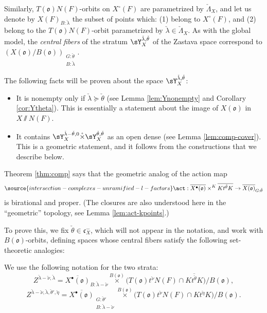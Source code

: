Similarly, $T(\mathfrak o)N(F)$-orbits on $X^\circ(F)$ are parametrized by $\check \Lambda_X$, and let us denote by $X(F)_{B:\check\lambda}$ the subset of points which: (1) belong to $X^\circ (F)$, and (2) belong to the $T(\mathfrak o)N(F)$-orbit parametrized by $\check\lambda\in\check\Lambda_X$. As with the global model, the \emph{central fibers} of the stratum $\sY_X^{\check\lambda,\check\theta}$ of the Zastava space correspond to $(X(\mathfrak o)/B(\mathfrak o))_{\substack{G:\check\theta \\ B:\check\lambda}}$.


The following facts will be proven about the space $\sY_X^{\check\lambda,\check\theta}$:
\begin{itemize}
 \item It is nonempty only if $\check\lambda \succeq \check\theta$ (see Lemma \ref{lem:Ynonempty} and Corollary \ref{cor:Ytheta}). This is essentially a statement about the image of $X(\mathfrak o)$ in $X\sslash N(F)$.
 \item It contains $\sY_X^{\check\lambda-\check\theta,0} \mathring\times \sY_X^{\check\theta,\check\theta}$ as an open dense (see Lemma \ref{lem:comp-cover}). This is a geometric statement, and it follows from the constructions that we describe below.
\end{itemize}

Theorem \ref{thm:comp} says that the geometric analog of the action map
\begin{equation}
 \label{eq:action-sets}
\source{intersection-complexes-unramified-l-factors}
\act: \overline{X^\bullet(\mathfrak o)} \times^{K}  \overline{K t^{\check\theta} K} \to \overline{X(\mathfrak o)}_{G:\check\theta}
\end{equation}
is birational and proper. (The closures are also understood here in the ``geometric'' topology, see Lemma \ref{lem:act-kpoints}.)

To prove this, we fix $\check\theta \in \mathfrak c_X^-$, which will not appear in the notation, and work with $B(\mathfrak o)$-orbits, defining spaces whose central fibers satisfy the following set-theoretic analogies:

We use the following notation for the two strata:
\[
Z^{\check\lambda-\check\nu,\check\lambda}
 = \overline{X^\bullet(\mathfrak o)}_{B:\check\lambda-\check\nu}
 \overset{B(\mathfrak o)}\times
 \bigl(T(\mathfrak o)t^{\check\nu}N(F)\cap\overline{Kt^{\check\theta}K}\bigr)/B(\mathfrak o),
\]
\[
Z^{\check\lambda-\check\nu,\check\lambda,\check\theta',\check\eta}
 = \overline{X^\bullet(\mathfrak o)}_{\substack{G:\check\theta'\\B:\check\lambda-\check\nu}}
 \overset{B(\mathfrak o)}\times
 \bigl(T(\mathfrak o)t^{\check\nu}N(F)\cap Kt^{\check\eta}K\bigr)/B(\mathfrak o).
\]

